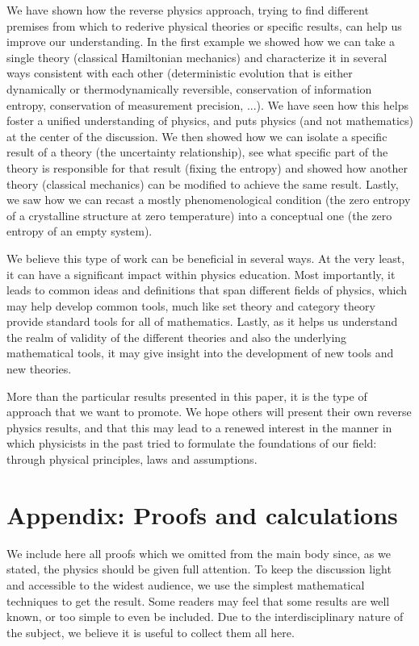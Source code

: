 \documentclass[10pt,twocolumn, nofootinbib]{revtex4-2}
\begin{document}
We have shown how the reverse physics approach, trying to find different premises from which to rederive physical theories or specific results, can help us improve our understanding. In the first example we showed how we can take a single theory (classical Hamiltonian mechanics) and characterize it in several ways consistent with each other (deterministic evolution that is either dynamically or thermodynamically reversible, conservation of information entropy, conservation of measurement precision, ...). We have seen how this helps foster a unified understanding of physics, and puts physics (and not mathematics) at the center of the discussion. We then showed how we can isolate a specific result of a theory (the uncertainty relationship), see what specific part of the theory is responsible for that result (fixing the entropy) and showed how another theory (classical mechanics) can be modified to achieve the same result. Lastly, we saw how we can recast a mostly phenomenological condition (the zero entropy of a crystalline structure at zero temperature) into a conceptual one (the zero entropy of an empty system).

We believe this type of work can be beneficial in several ways. At the very least, it can have a significant impact within physics education. Most importantly, it leads to common ideas and definitions that span different fields of physics, which may help develop common tools, much like set theory and category theory provide standard tools for all of mathematics. Lastly, as it helps us understand the realm of validity of the different theories and also the underlying mathematical tools, it may give insight into the development of new tools and new theories.

More than the particular results presented in this paper, it is the type of approach that we want to promote. We hope others will present their own reverse physics results, and that this may lead to a renewed interest in the manner in which physicists in the past tried to formulate the foundations of our field: through physical principles, laws and assumptions.

\section*{Appendix: Proofs and calculations}

We include here all proofs which we omitted from the main body since, as we stated, the physics should be given full attention. To keep the discussion light and accessible to the widest audience, we use the simplest mathematical techniques to get the result. Some readers may feel that some results are well known, or too simple to even be included. Due to the interdisciplinary nature of the subject, we believe it is useful to collect them all here.
\end{document}
